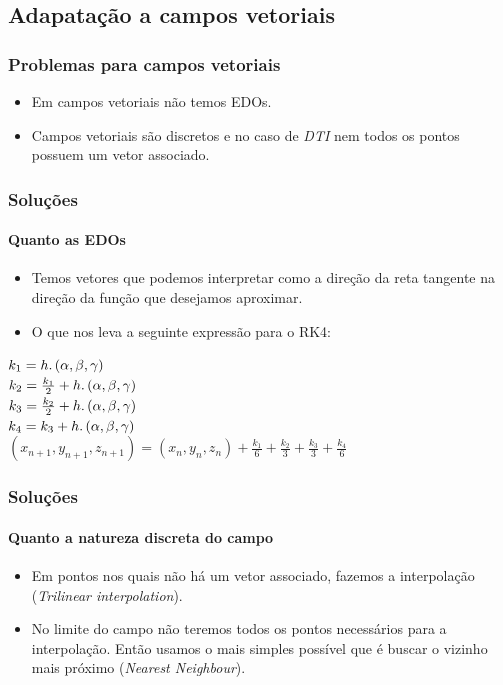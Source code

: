 \documentclass[brazil]{beamer}
\begin{document}
\subsection{Adapatação a campos vetoriais}
\begin{frame}
  \frametitle{Problemas para campos vetoriais}
  
  \begin{itemize}
    \item Em campos vetoriais não temos EDOs.
    \item Campos vetoriais são discretos e no caso de \textit{DTI} nem todos os pontos possuem um vetor associado.
  \end{itemize}
\end{frame}

\begin{frame}
  \frametitle{Soluções}
  \framesubtitle{Quanto as EDOs}
  
  \begin{itemize}
    \item Temos vetores que podemos interpretar como a direção da reta tangente na direção da função que desejamos aproximar.
    \item O que nos leva a seguinte expressão para o RK4:
  \end{itemize}

  $k_{1} = h\ldotp (\alpha ,\beta ,\gamma )$\\
  $k_{2} = \frac{k_{1}}{2} + h\ldotp (\alpha ,\beta ,\gamma )$\\
  $k_{3} = \frac{k_{2}}{2} + h\ldotp (\alpha ,\beta ,\gamma )$\\
  $k_{4} = k_{3} + h\ldotp (\alpha ,\beta ,\gamma )$\\
  $(x_{n+1}, y_{n+1}, z_{n+1}) = (x_{n}, y_{n}, z_{n}) + \frac{k_{1}}{6} + \frac{k_{2}}{3} + \frac{k_{3}}{3} + \frac{k_{4}}{6}$

\end{frame}

\begin{frame}
  \frametitle{Soluções}
  \framesubtitle{Quanto a natureza discreta do campo}

  \begin{itemize}
    \item Em pontos nos quais não há um vetor associado, fazemos a interpolação (\textit{Trilinear interpolation}).
    \item No limite do campo não teremos todos os pontos necessários para a interpolação. Então usamos o mais simples possível que é buscar o vizinho mais próximo (\textit{Nearest Neighbour}).
  \end{itemize}
\end{frame}
\end{document}

